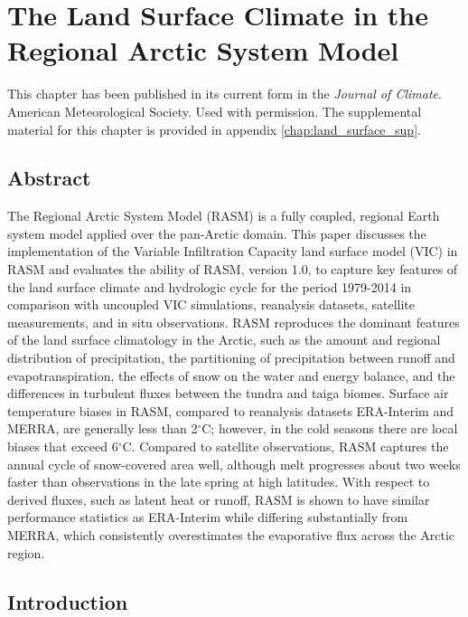 
\chapter{The Land Surface Climate in the Regional Arctic System Model}
\label{chap:land_surface}

This chapter has been published in its current form in the \textit{Journal of Climate}.
\textcopyright American Meteorological Society.
Used with permission.
The supplemental material for this chapter is provided in appendix \ref{chap:land_surface_sup}.


\section*{Abstract}

The Regional Arctic System Model (RASM) is a fully coupled, regional Earth system model applied over the pan-Arctic domain.
This paper discusses the implementation of the Variable Infiltration Capacity land surface model (VIC) in RASM and evaluates the ability of RASM, version 1.0, to capture key features of the land surface climate and hydrologic cycle for the period 1979-2014 in comparison with uncoupled VIC simulations, reanalysis datasets, satellite measurements, and in situ observations.
RASM reproduces the dominant features of the land surface climatology in the Arctic, such as the amount and regional distribution of precipitation, the partitioning of precipitation between runoff and evapotranspiration, the effects of snow on the water and energy balance, and the differences in turbulent fluxes between the tundra and taiga biomes.
Surface air temperature biases in RASM, compared to reanalysis datasets ERA-Interim and MERRA, are generally less than 2$^{\circ}$C; however, in the cold seasons there are local biases that exceed 6$^{\circ}$C.
Compared to satellite observations, RASM captures the annual cycle of snow-covered area well, although melt progresses about two weeks faster than observations in the late spring at high latitudes.
With respect to derived fluxes, such as latent heat or runoff, RASM is shown to have similar performance statistics as ERA-Interim while differing substantially from MERRA, which consistently overestimates the evaporative flux across the Arctic region.

\section{Introduction}
\label{sec:intro_ch3}

